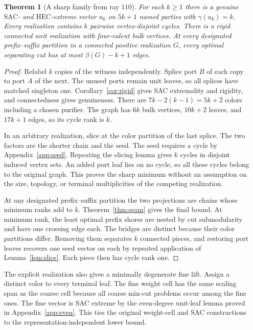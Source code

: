 \documentclass[11pt]{article}
\newtheorem{theorem}{Theorem}[section]
\newcommand{\SAC}{\mathrm{SAC}}
\newcommand{\HEC}{\mathrm{HEC}}
\begin{document}
\begin{theorem}[A sharp family from ray \(110\)]
\label{thm:chain}
For each \(k\geq1\) there is a genuine \(\SAC\)- and \(\HEC\)-extreme
vector \(u_k\) on \(5k+1\) named parties with \(\gamma(u_k)=k\).
Every realization contains \(k\) pairwise vertex-disjoint cycles.
There is a rigid connected unit realization with four-valent bulk
vertices. At every designated prefix--suffix partition in a connected
positive realization \(G\), every optimal separating cut has at most
\(\beta(G)-k+1\) edges.
\end{theorem}

\begin{proof}
Relabel \(k\) copies of the witness independently. Splice port \(B\)
of each copy to port \(A\) of the next. The unused ports remain unit
leaves, so all splices have matched singleton one. Corollary~\ref{cor:rigid}
gives SAC extremality and rigidity, and connectedness gives genuineness.
There are \(7k-2(k-1)=5k+2\) colors including a chosen purifier.
The graph has \(6k\) bulk vertices, \(10k+2\) leaves, and \(17k+1\)
edges, so its cycle rank is \(k\).

In an arbitrary realization, slice at the color partition of the last
splice. The two factors are the shorter chain and the seed. The seed
requires a cycle by Appendix~\ref{app:seed}. Repeating the slicing
lemma gives \(k\) cycles in disjoint induced vertex sets. An added
port leaf lies on no cycle, so all these cycles belong to the original
graph. This proves the sharp minimum without an assumption on the
size, topology, or terminal multiplicities of the competing realization.

At any designated prefix--suffix partition the two projections are
chains whose minimum ranks add to \(k\). Theorem~\ref{thm:seam} gives
the final bound. At minimum rank, the least optimal prefix shores
are nested by cut submodularity and have one crossing edge each.
The bridges are distinct because their color partitions differ.
Removing them separates \(k\) connected pieces, and restoring port
leaves recovers one seed vector on each by repeated application of
Lemma~\ref{lem:slice}. Each piece then has cycle rank one.
\end{proof}

The explicit realization also gives a minimally degenerate fine lift.
Assign a distinct color to every terminal leaf. The fine weight cell
has the same scaling span as the coarse cell because all coarse
min-cut problems occur among the fine ones. The fine vector is SAC
extreme by the even-degree unit-leaf lemma proved in
Appendix~\ref{app:even}. This ties the original weight-cell and SAC
constructions to the representation-independent lower bound.
\end{document}
